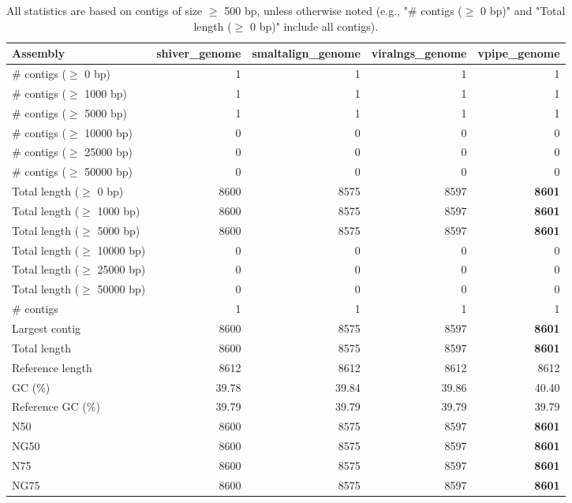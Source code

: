 \documentclass[12pt,a4paper]{article}
\begin{document}
\begin{table}[ht]
\begin{center}
\caption{All statistics are based on contigs of size $\geq$ 500 bp, unless otherwise noted (e.g., "\# contigs ($\geq$ 0 bp)" and "Total length ($\geq$ 0 bp)" include all contigs).}
\begin{tabular}{|l*{4}{|r}|}
\hline
Assembly & shiver\_genome & smaltalign\_genome & viralngs\_genome & vpipe\_genome \\ \hline
\# contigs ($\geq$ 0 bp) & 1 & 1 & 1 & 1 \\ \hline
\# contigs ($\geq$ 1000 bp) & 1 & 1 & 1 & 1 \\ \hline
\# contigs ($\geq$ 5000 bp) & 1 & 1 & 1 & 1 \\ \hline
\# contigs ($\geq$ 10000 bp) & 0 & 0 & 0 & 0 \\ \hline
\# contigs ($\geq$ 25000 bp) & 0 & 0 & 0 & 0 \\ \hline
\# contigs ($\geq$ 50000 bp) & 0 & 0 & 0 & 0 \\ \hline
Total length ($\geq$ 0 bp) & 8600 & 8575 & 8597 & {\bf 8601} \\ \hline
Total length ($\geq$ 1000 bp) & 8600 & 8575 & 8597 & {\bf 8601} \\ \hline
Total length ($\geq$ 5000 bp) & 8600 & 8575 & 8597 & {\bf 8601} \\ \hline
Total length ($\geq$ 10000 bp) & 0 & 0 & 0 & 0 \\ \hline
Total length ($\geq$ 25000 bp) & 0 & 0 & 0 & 0 \\ \hline
Total length ($\geq$ 50000 bp) & 0 & 0 & 0 & 0 \\ \hline
\# contigs & 1 & 1 & 1 & 1 \\ \hline
Largest contig & 8600 & 8575 & 8597 & {\bf 8601} \\ \hline
Total length & 8600 & 8575 & 8597 & {\bf 8601} \\ \hline
Reference length & 8612 & 8612 & 8612 & 8612 \\ \hline
GC (\%) & 39.78 & 39.84 & 39.86 & 40.40 \\ \hline
Reference GC (\%) & 39.79 & 39.79 & 39.79 & 39.79 \\ \hline
N50 & 8600 & 8575 & 8597 & {\bf 8601} \\ \hline
NG50 & 8600 & 8575 & 8597 & {\bf 8601} \\ \hline
N75 & 8600 & 8575 & 8597 & {\bf 8601} \\ \hline
NG75 & 8600 & 8575 & 8597 & {\bf 8601} \\ \hline

\end{tabular}
\end{center}
\end{table}
\end{document}
